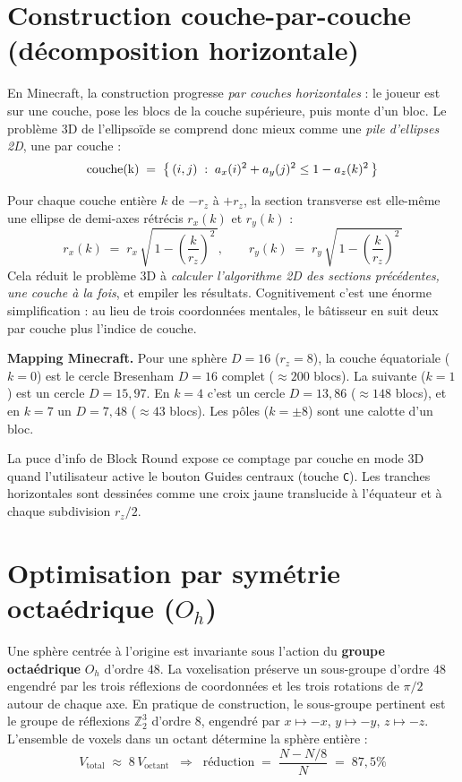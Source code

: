\documentclass[12pt,a4paper]{scrartcl}
\newcommand{\code}[1]{\texttt{\small #1}}
\newcommand{\acc}[1]{\textcolor{accent}{\textbf{#1}}}
\begin{document}
\section{Construction couche-par-couche (décomposition horizontale)}

En Minecraft, la construction progresse \emph{par couches horizontales} : le joueur est sur une couche, pose les blocs de la couche supérieure, puis monte d'un bloc. Le problème 3D de l'ellipsoïde se comprend donc mieux comme une \emph{pile d'ellipses 2D}, une par couche :
\[
\text{\text{couche}(k)} \;=\; \bigl\{\,(i,j)\;:\;a_x(i)^2 + a_y(j)^2 \leq 1 - a_z(k)^2\,\bigr\}
\]

Pour chaque couche entière $k$ de $-r_z$ à $+r_z$, la section transverse est elle-même une ellipse de demi-axes rétrécis $r_x(k)$ et $r_y(k)$ :
\[
r_x(k) \;=\; r_x\,\sqrt{\,1 - \left(\dfrac{k}{r_z}\right)^{\!2}\,},
\qquad
r_y(k) \;=\; r_y\,\sqrt{\,1 - \left(\dfrac{k}{r_z}\right)^{\!2}\,}
\]
Cela réduit le problème 3D à \emph{calculer l'algorithme 2D des sections précédentes, une couche à la fois}, et empiler les résultats. Cognitivement c'est une énorme simplification : au lieu de trois coordonnées mentales, le bâtisseur en suit deux par couche plus l'indice de couche.

\begin{minec}
\textbf{Mapping Minecraft.} Pour une sphère $D=16$ ($r_z = 8$), la couche équatoriale ($k=0$) est le cercle Bresenham $D=16$ complet ($\approx 200$ blocs). La suivante ($k=1$) est un cercle $D=15{,}97$. En $k=4$ c'est un cercle $D=13{,}86$ ($\approx 148$ blocs), et en $k=7$ un $D=7{,}48$ ($\approx 43$ blocs). Les pôles ($k = \pm 8$) sont une calotte d'un bloc.
\end{minec}

La puce d'info de Block Round expose ce comptage par couche en mode 3D quand l'utilisateur active le bouton Guides centraux (touche \code{C}). Les tranches horizontales sont dessinées comme une croix jaune translucide à l'équateur et à chaque subdivision $r_z/2$.

\section{Optimisation par symétrie octaédrique ($O_h$)}

Une sphère centrée à l'origine est invariante sous l'action du \acc{groupe octaédrique} $O_h$ d'ordre $48$. La voxelisation préserve un sous-groupe d'ordre $48$ engendré par les trois réflexions de coordonnées et les trois rotations de $\pi/2$ autour de chaque axe. En pratique de construction, le sous-groupe pertinent est le groupe de réflexions $\mathbb{Z}_2^3$ d'ordre $8$, engendré par $x \mapsto -x$, $y \mapsto -y$, $z \mapsto -z$. L'ensemble de voxels dans un octant détermine la sphère entière :
\[
V_{\mathrm{total}} \;\approx\; 8\,V_{\mathrm{octant}}\;\;\Longrightarrow\;\;
\text{réduction}\;=\;\frac{N - N/8}{N} \;=\; 87{,}5\%
\]
\end{document}
